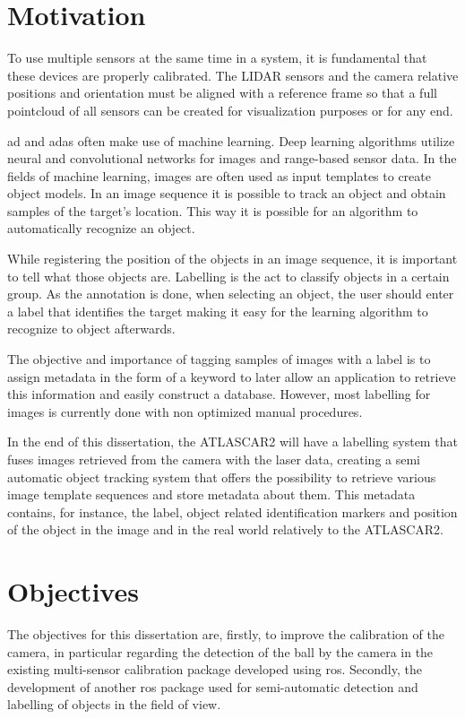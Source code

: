 \section{Motivation}
To use multiple sensors at the same time in a system, it is fundamental that these devices are properly calibrated. The LIDAR sensors and the camera relative positions and orientation must be aligned with a reference frame so that a full pointcloud of all sensors can be created for visualization purposes or for any end.

\gls{ad} and \gls{adas} often make use of machine learning. Deep learning algorithms utilize neural and convolutional networks for images and range-based sensor data. In the fields of machine learning, images are often used as input templates to create object models. In an image sequence it is possible to track an object and obtain samples of the target's location. This way it is possible for an algorithm to automatically recognize an object.

While registering the position of the objects in an image sequence, it is important to tell what those objects are. Labelling is the act to classify objects in a certain group. As the annotation is done, when selecting an object, the user should enter a label that identifies the target making it easy for the learning algorithm to recognize to object afterwards.

The objective and importance of tagging samples of images with a label is to assign metadata in the form of a keyword to later allow an application to retrieve this information and easily construct a database. However, most labelling for images is currently done with non optimized manual procedures.

In the end of this dissertation, the ATLASCAR2 will have a labelling system that fuses images retrieved from the camera with the laser data, creating a semi automatic object tracking system that offers the possibility to retrieve various image template sequences and store metadata about them. This metadata contains, for instance, the label, object related identification markers and position of the object in the image and in the real world relatively to the ATLASCAR2.

\section{Objectives}
The objectives for this dissertation are, firstly, to improve the calibration of the camera, in particular regarding the detection of the ball by the camera in the existing multi-sensor calibration package developed using \gls{ros}. Secondly, the development of another \gls{ros} package used for semi-automatic detection and labelling of objects in the field of view.

